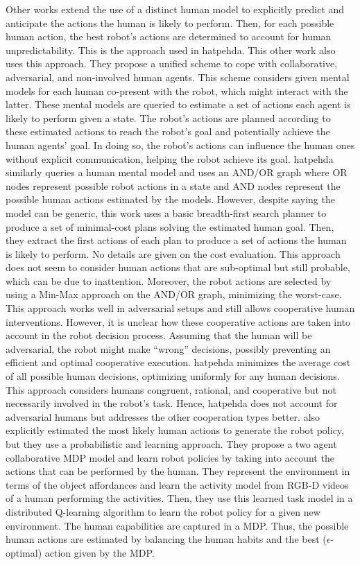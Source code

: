 Other works extend the use of a distinct human model to explicitly predict and anticipate the actions the human is likely to perform. Then, for each possible human action, the best robot's actions are determined to account for human unpredictability. This is the approach used in \acrshort{hatpehda}.
This other work \cite{buckingham_robot_2020} also uses this approach. They propose a unified scheme to cope with collaborative, adversarial, and non-involved human agents. This scheme considers given mental models for each human co-present with the robot, which might interact with the latter. These mental models are queried to estimate a set of actions each agent is likely to perform given a state. The robot's actions are planned according to these estimated actions to reach the robot's goal and potentially achieve the human agents' goal. In doing so, the robot's actions can influence the human ones without explicit communication, helping the robot achieve its goal. \acrshort{hatpehda} similarly queries a human mental model and uses an AND/OR graph where OR nodes represent possible robot actions in a state and AND nodes represent the possible human actions estimated by the models. However, despite saying the model can be generic, this work uses a basic breadth-first search planner to produce a set of minimal-cost plans solving the estimated human goal. Then, they extract the first actions of each plan to produce a set of actions the human is likely to perform. No details are given on the cost evaluation. This approach does not seem to consider human actions that are sub-optimal but still probable, which can be due to inattention. Moreover, the robot actions are selected by using a Min-Max approach on the AND/OR graph, minimizing the worst-case. This approach works well in adversarial setups and still allows cooperative human interventions. However, it is unclear how these cooperative actions are taken into account in the robot decision process. Assuming that the human will be adversarial, the robot might make ``wrong'' decisions, possibly preventing an efficient and optimal cooperative execution. \acrshort{hatpehda} minimizes the average cost of all possible human decisions, optimizing uniformly for any human decisions. This approach considers humans congruent, rational, and cooperative but not necessarily involved in the robot's task. Hence, \acrshort{hatpehda} does not account for adversarial humans but addresses the other cooperation types better.
\cite{koppula2016anticipatory} also explicitly estimated the most likely human actions to generate the robot policy, but they use a probabilistic and learning approach. They propose a two agent collaborative MDP model and learn robot policies by taking into account the actions that can be performed by the human. They represent the environment in terms of the object affordances and learn the activity model from RGB-D videos of a human performing the activities. Then, they use this learned task model in a distributed Q-learning algorithm to learn the robot policy for a given new environment. 
The human capabilities are captured in a MDP. Thus, the possible human actions are estimated by balancing the human habits and the best ($\epsilon$-optimal) action given by the MDP. 


